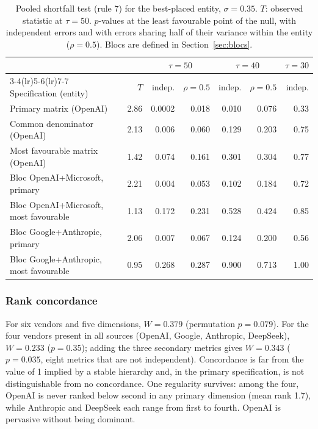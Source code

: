 \documentclass[11pt]{article}
\begin{document}
\begin{table}[t]
\centering\small
\caption{Pooled shortfall test (rule 7) for the best-placed entity, $\sigma=0.35$. $T$: observed statistic at $\tau=50$. $p$-values at the least favourable point of the null, with independent errors and with errors sharing half of their variance within the entity ($\rho=0.5$). Blocs are defined in Section~\ref{sec:blocs}.}
\label{tab:pooled}
\begin{tabular}{@{}lrrrrrr@{}}
\toprule
& & \multicolumn{2}{c}{$\tau=50$} & \multicolumn{2}{c}{$\tau=40$} & $\tau=30$ \\
\cmidrule(lr){3-4}\cmidrule(lr){5-6}\cmidrule(lr){7-7}
Specification (entity) & $T$ & indep. & $\rho=0.5$ & indep. & $\rho=0.5$ & indep. \\
\midrule
Primary matrix (OpenAI) & 2.86 & 0.0002 & 0.018 & 0.010 & 0.076 & 0.33 \\
Common denominator (OpenAI) & 2.13 & 0.006 & 0.060 & 0.129 & 0.203 & 0.75 \\
Most favourable matrix (OpenAI) & 1.42 & 0.074 & 0.161 & 0.301 & 0.304 & 0.77 \\
Bloc OpenAI+Microsoft, primary & 2.21 & 0.004 & 0.053 & 0.102 & 0.184 & 0.72 \\
Bloc OpenAI+Microsoft, most favourable & 1.13 & 0.172 & 0.231 & 0.528 & 0.424 & 0.85 \\
Bloc Google+Anthropic, primary & 2.06 & 0.007 & 0.067 & 0.124 & 0.200 & 0.56 \\
Bloc Google+Anthropic, most favourable & 0.95 & 0.268 & 0.287 & 0.900 & 0.713 & 1.00 \\
\bottomrule
\end{tabular}
\end{table}

\subsubsection{Rank concordance} For six vendors and five dimensions, $W=0.379$ (permutation $p=0.079$). For the four vendors present in all sources (OpenAI, Google, Anthropic, DeepSeek), $W=0.233$ ($p=0.35$); adding the three secondary metrics gives $W=0.343$ ($p=0.035$, eight metrics that are not independent). Concordance is far from the value of 1 implied by a stable hierarchy and, in the primary specification, is not distinguishable from no concordance. One regularity survives: among the four, OpenAI is never ranked below second in any primary dimension (mean rank 1.7), while Anthropic and DeepSeek each range from first to fourth. OpenAI is pervasive without being dominant.
\end{document}
